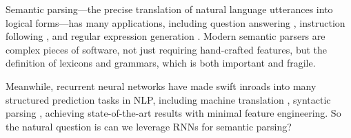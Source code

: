 \documentclass[11pt,letterpaper]{article}
\newcommand\pl[1]{\textcolor{red}{[PL: #1]}}
\newcommand\rj[1]{\textcolor{blue}{[RJ: #1]}}
\begin{document}
Semantic parsing---the precise translation of natural language utterances into 
logical forms---has many applications,
including question answering \cite{zelle96geoquery,zettlemoyer05ccg,zettlemoyer07relaxed,liang11dcs,artzi2013weakly,berant2013freebase},
instruction following \cite{artzi2013weakly},
and regular expression generation \cite{kushman2013regex}.
Modern semantic parsers \cite{artzi2013uw,berant2013freebase} are complex pieces of software,
not just requiring hand-crafted features,
but the definition of lexicons and grammars,
which is both important and fragile.


Meanwhile, recurrent neural networks have made swift inroads into 
many structured prediction tasks in NLP,
including machine translation
\cite{sutskever2014sequence,bahdanau2014neural}, 
syntactic parsing \cite{vinyals2015grammar,dyer2015transition},
achieving state-of-the-art results with minimal feature engineering.
So the natural question is can we leverage RNNs for semantic parsing?

\end{document}
